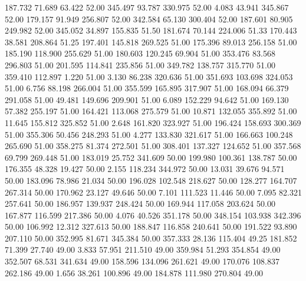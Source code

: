  187.732   71.689   63.422        52.00
 345.497   93.787  330.975        52.00
   4.083   43.941  345.867        52.00
 179.157   91.949  256.807        52.00
 342.584   65.130  300.404        52.00
 187.601   80.905  249.982        52.00
 345.052   34.897  155.835        51.50
 181.674   70.144  224.006        51.33
 170.443   38.581  208.864        51.25
 197.401  145.818  269.525        51.00
 175.396   89.013  256.158        51.00
 185.190  118.900  255.629        51.00
 180.603  120.245   69.904        51.00
 353.476   83.568  296.803        51.00
 201.595  114.841  235.856        51.00
 349.782  138.757  315.770        51.00
 359.410  112.897    1.220        51.00
   3.130   86.238  320.636        51.00
 351.693  103.698  324.053        51.00
   6.756   88.198  266.004        51.00
 355.599  165.895  317.907        51.00
 168.094   66.379  291.058        51.00
  49.481  149.696  209.901        51.00
   6.089  152.229   94.642        51.00
 169.130   57.382  255.197        51.00
 164.421  113.068  275.579        51.00
  10.871  132.055  355.892        51.00
  11.645  155.812  325.852        51.00
   2.648  161.820  323.927        51.00
 196.424  158.693  300.369        51.00
 355.306   50.456  248.293        51.00
   4.277  133.830  321.617        51.00
 166.663  100.248  265.690        51.00
 358.275   81.374  272.501        51.00
 308.401  137.327  124.652        51.00
 357.568   69.799  269.448        51.00
 183.019   25.752  341.609        50.00
 199.980  100.361  138.787        50.00
 176.355   48.328   19.427        50.00
   2.155  118.234  344.972        50.00
  13.031   39.676   94.571        50.00
 183.096   78.986   21.034        50.00
 196.028  102.548  218.627        50.00
 128.277  164.707  267.314        50.00
 170.962   23.127   49.646        50.00
   7.101  111.523   11.446        50.00
   7.095   82.321  257.641        50.00
 186.957  139.937  248.424        50.00
 169.944  117.058  203.624        50.00
 167.877  116.599  217.386        50.00
   4.076   40.526  351.178        50.00
 348.154  103.938  342.396        50.00
 106.992   12.312  327.613        50.00
 188.847  116.858  240.641        50.00
 191.522   93.890  207.110        50.00
 352.995   81.671  345.384        50.00
 357.333   28.136  115.404        49.25
 181.852   71.399   27.740        49.00
   3.833   57.951  211.510        49.00
 359.984   51.293  354.854        49.00
 352.507   68.531  341.634        49.00
 158.596  134.096  261.621        49.00
 170.076  108.837  262.186        49.00
   1.656   38.261  100.896        49.00
 184.878  111.980  270.804        49.00
